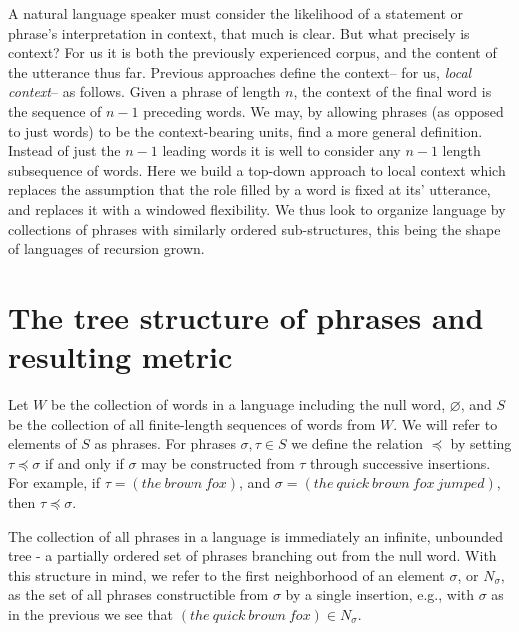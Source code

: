 A natural language speaker must consider the likelihood of a statement
or phrase's interpretation in context, that much is clear. But what
precisely is context? For us it is both the previously experienced
corpus, and the content of the utterance thus far. Previous approaches
\cite{Piantadosi01} define the context-- for us, \emph{local
context}-- as follows. Given a phrase of length $n$, the context of
the final word is the sequence of $n-1$ preceding words. We may, by
allowing phrases (as opposed to just words) to be the context-bearing
units, find a more general definition. Instead of just the $n-1$
leading words it is well to consider any $n-1$ length subsequence of
words. Here we build a top-down approach to local context which
replaces the assumption that the role filled by a word is fixed at
its' utterance, and replaces it with a windowed flexibility. We thus
look to organize language by collections of phrases with similarly
ordered sub-structures, this being the shape of languages of recursion
grown.



\section{The tree structure of phrases and resulting metric}

Let $W$ be the collection of words in a language including the null
word, $\varnothing$, and $S$ be the collection of all finite-length
sequences of words from $W$. We will refer to elements of $S$ as
phrases. For phrases $\sigma,\tau\in S$ we define the relation
$\preceq$ by setting $\tau\preceq\sigma$ if and only if $\sigma$ may
be constructed from $\tau$ through successive insertions. For example,
if $\tau=(the\:brown\:fox)$, and
$\sigma=(the\:quick\:brown\:fox\:jumped)$, then $\tau\preceq\sigma$.

The collection of all phrases in a language is immediately an
infinite, unbounded tree - a partially ordered set of phrases
branching out from the null word. With this structure in mind, we
refer to the first neighborhood of an element $\sigma$, or $N_\sigma$,
as the set of all phrases constructible from $\sigma$ by a single
insertion, e.g., with $\sigma$ as in the previous we see that $(the\:
quick\: brown\: fox)\in N_\sigma$.

